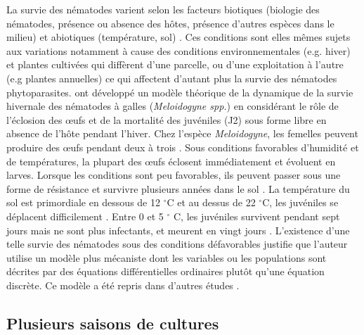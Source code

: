 	La survie des nématodes varient selon les facteurs biotiques (biologie des nématodes, présence ou absence des hôtes, présence d'autres espèces dans le milieu) et abiotiques (température, sol)  \citep{Bergeson1968, Abad2010, Perry2009}. Ces conditions sont elles mêmes sujets aux variations notamment à cause des conditions  environnementales (e.g. hiver) et plantes cultivées qui diffèrent d'une parcelle, ou d'une exploitation à l'autre (e.g plantes annuelles) ce qui  affectent d'autant plus la survie des nématodes phytoparasites.   
\citet{Jeger1985} ont développé  un modèle théorique de la dynamique de la survie hivernale des nématodes à galles (\textit{Meloidogyne spp.}) 
en considérant le rôle de l'éclosion des œufs et de la mortalité des juvéniles (J2) sous forme libre en absence de l'hôte pendant l'hiver. Chez l'espèce \textit{Meloidogyne}, 
les femelles peuvent produire des œufs pendant deux à trois \citep{DeGuiran1983}. Sous  conditions  favorables  d’humidité  et de températures, la plupart des œufs éclosent immédiatement et évoluent en larves.  Lorsque  les  conditions  sont  peu  favorables,  ils  peuvent  passer  sous  une  forme  de  résistance  et  survivre  plusieurs années    dans  le  sol  \citep{DeGuiran1983}. La  température  du  sol  est  primordiale  en  dessous  de  12  $^\circ$C  et  au­ dessus  de  22  $^\circ$C,  les  juvéniles  se  déplacent  difficilement  \citep{Vrain1978}.  Entre  0  et  5 $^\circ$ C,  les  juvéniles  survivent  pendant  sept jours mais ne sont plus infectants, et  meurent  en  vingt  jours  \citep{Vrain1978, Tsai2008}.  L’existence d'une telle  survie des nématodes sous des conditions défavorables justifie que l'auteur utilise un modèle plus mécaniste dont les variables ou les populations  sont décrites par des équations différentielles ordinaires plutôt qu'une équation discrète. Ce modèle a été repris dans d'autres études \citep{Starr1985, Jeger1993}. 

	
\subsection{Plusieurs saisons de cultures}
\label{sec:plusieurs-saisons}
	
